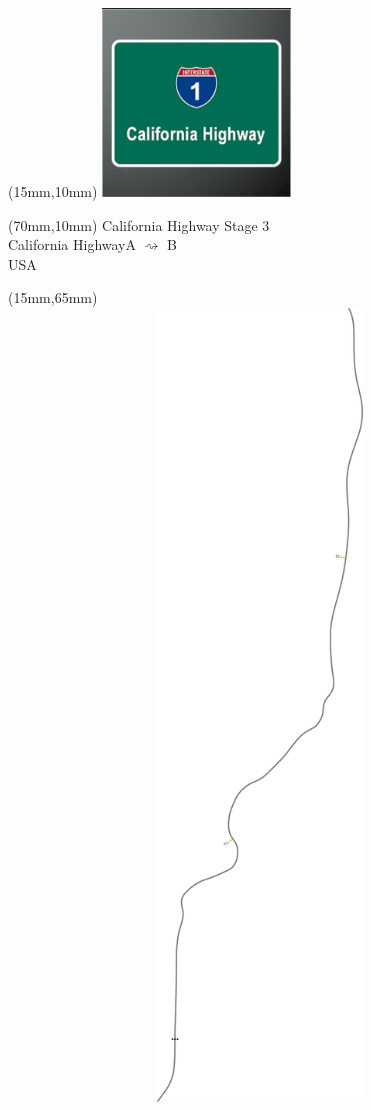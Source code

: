 \null\newpage
\begin{textblock*}{50mm}(15mm,10mm)%
\includegraphics[width=50mm]{LG/2015-05-20_00077.png}
\end{textblock*}
\begin{textblock*}{130mm}(70mm,10mm)%
{\fontsize{20}{20}\selectfont California Highway Stage 3\\}
{\fontsize{16}{16}\selectfont California Highway\hfill A $\rightsquigarrow$ B\\}
{\fontsize{12}{12}\selectfont USA\\}
\end{textblock*}
\begin{textblock*}{185mm}(15mm,65mm)%
\centering
\mbox{\includegraphics[width=185mm,height=210mm,keepaspectratio]{PT/CAHIS3.pdf}}
\end{textblock*}
